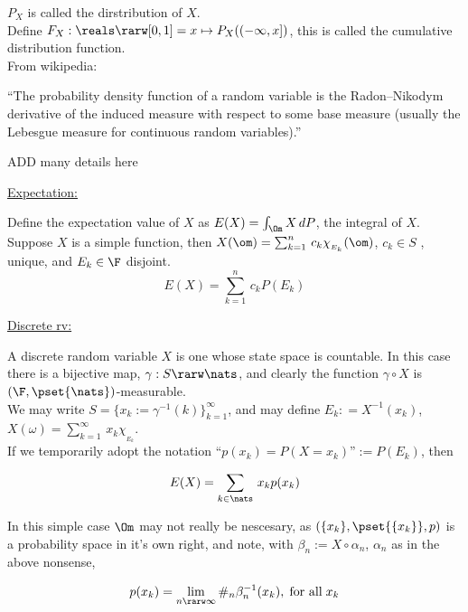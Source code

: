 $P_X$ is called the dirstribution of $X$. \\

Define $F_X : \reals \rarw [0,1] = x \mapsto P_X((-\infty,x])$, this is called the cumulative distribution function.\\

From wikipedia:

``The probability density function of a random variable is the Radon–Nikodym derivative of the induced measure with respect to some base measure (usually the Lebesgue measure for continuous random variables).''

ADD many details here



\begin{flushleft}
\underline{Expectation:}
\end{flushleft}

Define the expectation value of $X$ as $E(X) = \int_{\Om} X \, dP$, the integral of $X$.\\

Suppose $X$ is a simple function, then $X(\om) = \sum_{k=1}^n \, c_k \chi_{_{E_k}} (\om)$, $c_k \in S$ , unique, and $E_k \in \F$ disjoint.\\

$$
	E(X) =  \sum_{k=1}^n \, c_k P(E_k)
$$

\begin{flushleft}
\underline{Discrete rv:}
\end{flushleft}

A discrete random variable $X$ is one whose state space is countable. In this case there is a bijective map, $\gamma : S \rarw \nats$, and clearly the function $\gamma \circ X	$ is $( \F, \pset{\nats} )$-measurable. \\ We may write $S = \{ x_k := \gamma^{-1}(k) \}_{k=1}^\infty$, and may define $E_k :	= X^{-1}(x_k)$, $X(\omega) = \sum_{k=1}^\infty \, x_k \chi_{_{E_k}} $. \\ If we temporarily adopt the notation ``$p(x_k) = P(X = x_k)$''$ := P(E_k)$, then


$$
	E(X) =  \sum_{k \in \nats} \, x_k p(x_k)
$$

In this simple case $\Om$ may not really be nescesary, as $( \{x_k \}, \pset{\{x_k\}}, p)$ is a probability space in it's own right, and note, with $\beta_n := X \circ \alpha_n$, $\alpha_n$ as in the above nonsense,

$$
	p(x_k) = \lim_{n \rarw \infty} \#_n \beta_n^{-1} ( x_k ), \; \textrm{for all} \; x_k
$$

